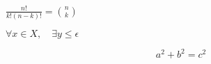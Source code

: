 
$\frac{n!}{k!(n-k)!} = \binom{n}{k}$


\medskip

$\forall x \in X, \quad \exists y \leq \epsilon$

\begin{equation}
a^2 + b^2 = c^2
\end{equation}